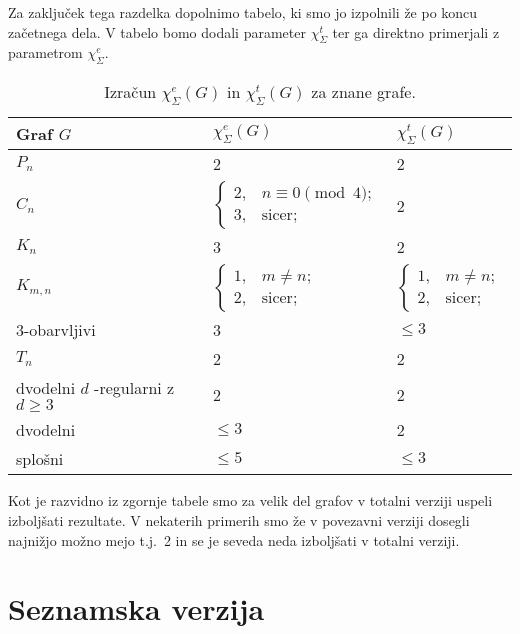 \documentclass[12pt,a4paper,twoside]{article}
\theoremstyle{definition} %
\theoremstyle{plain} %
\newcommand{\ec}{\chi_{\Sigma}^e}
\newcommand{\ect}{\chi_{\Sigma}^t}
\numberwithin{equation}{section}  %
\begin{document}
Za zaključek tega razdelka dopolnimo tabelo, ki smo jo izpolnili že po koncu začetnega dela. V tabelo bomo dodali parameter $\ect$ ter ga direktno primerjali z parametrom $\ec$.
\begin{table}[H]
\caption{\label{tab:tab2} Izračun $\ec(G)$ in $\ect(G)$ za znane grafe. }
\centering
\begin{tabular}{|l|l|l|}
\hline
 Graf $G$ & $\ec(G)$ & $\ect(G) $ \\ \hline
 $P_n$ & 2 & 2 \\ \hline
 $C_n$ & $\begin{cases}
	2, & n \equiv 0 \pmod{4};\\ 
	3, & \text{sicer};
	\end{cases}$ & 2 \\ \hline
 $K_n$& 3 & 2 \\ \hline
 $K_{m,n}$& $\begin{cases}
	1 ,& m \neq n;\\ 
	2 ,& \text{sicer};
	\end{cases}$ &$\begin{cases}
	1, & m \neq n;\\ 
	2, & \text{sicer};
	\end{cases}$ \\ \hline
 $3$-obarvljivi& 3 & $\le 3$ \\ \hline
$T_n$ & 2 & 2\\ \hline
dvodelni $d$ -regularni z $d \ge 3 $ & 2  & 2\\ \hline
dvodelni   & $\le 3$  & 2\\ \hline
splošni   & $\le 5$  &$ \le 3$\\ \hline
\end{tabular}
\end{table}
Kot je razvidno iz zgornje tabele smo za velik del grafov v totalni verziji uspeli izboljšati rezultate. V nekaterih primerih smo že v povezavni verziji dosegli najnižjo možno mejo t.j.\ 2 in se je seveda neda izboljšati v totalni verziji.


\section{Seznamska verzija} 
\end{document}
